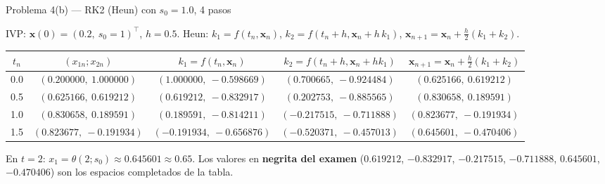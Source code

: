 \documentclass[aspectratio=169,10pt]{beamer}
\begin{document}
\begin{frame}{Problema 4(b) — RK2 (Heun) con $s_0=1.0$, 4 pasos}
\begin{cardnota}[\faPlay]
{\footnotesize IVP: $\mathbf x(0)=(0.2,\ s_0{=}1)^{\!\top}$, $h=0.5$. Heun: $k_1=f(t_n,\mathbf x_n)$, $k_2=f(t_n{+}h,\mathbf x_n{+}h\,k_1)$, $\mathbf x_{n+1}=\mathbf x_n+\tfrac h2(k_1+k_2)$.}
\end{cardnota}
\vspace{1mm}
\begin{center}
{\scriptsize\renewcommand{\arraystretch}{1.35}\setlength{\tabcolsep}{5pt}
\begin{tabular}{c|c|c|c|c}
\toprule
$t_n$ & $(x_{1n};x_{2n})$ & $k_1=f(t_n,\mathbf x_n)$ & $k_2=f(t_n{+}h,\mathbf x_n{+}h k_1)$ & $\mathbf x_{n+1}=\mathbf x_n+\tfrac h2(k_1{+}k_2)$\\
\midrule
0.0 & $(0.200000,\ 1.000000)$ & $(1.000000,\ -0.598669)$ & $(0.700665,\ -0.924484)$ & $(0.625166,\ 0.619212)$\\
0.5 & $(0.625166,\ 0.619212)$ & $(0.619212,\ -0.832917)$ & $(0.202753,\ -0.885565)$ & $(0.830658,\ 0.189591)$\\
1.0 & $(0.830658,\ 0.189591)$ & $(0.189591,\ -0.814211)$ & $(-0.217515,\ -0.711888)$ & $(0.823677,\ -0.191934)$\\
1.5 & $(0.823677,\ -0.191934)$ & $(-0.191934,\ -0.656876)$ & $(-0.520371,\ -0.457013)$ & $(0.645601,\ -0.470406)$\\
\bottomrule
\end{tabular}}
\end{center}
\vspace{1mm}
\begin{cardnota}[\faCheckCircle]
{\footnotesize En $t=2$: $x_1=\theta(2;s_0)\approx 0.645601\approx 0.65$. Los valores en \textbf{negrita del examen} ($0.619212$, $-0.832917$, $-0.217515$, $-0.711888$, $0.645601$, $-0.470406$) son los espacios completados de la tabla.}
\end{cardnota}
\end{frame}
\end{document}
